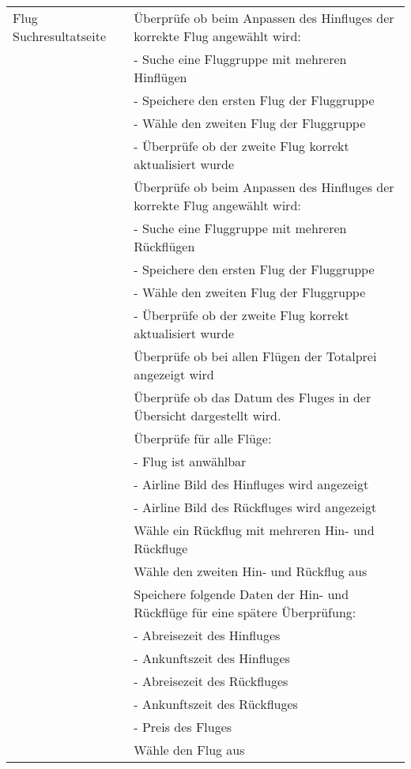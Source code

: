 \begin{table}[H]
\begin{tabularx}{0.9\textwidth}{ | l | X | }
		\multirow{1}{*}{Flug Suchresultatseite} & Überprüfe ob beim Anpassen des Hinfluges der korrekte Flug angewählt wird: \\ \cline{2-2}
		& - Suche eine Fluggruppe mit mehreren Hinflügen \\ \cline{2-2}
		& - Speichere den ersten Flug der Fluggruppe \\ \cline{2-2}
		& - Wähle den zweiten Flug der Fluggruppe \\ \cline{2-2}
		& - Überprüfe ob der zweite Flug korrekt aktualisiert wurde \\ \cline{2-2}& Überprüfe ob beim Anpassen des Hinfluges der korrekte Flug angewählt wird: \\ \cline{2-2}
		& - Suche eine Fluggruppe mit mehreren Rückflügen \\ \cline{2-2}
		& - Speichere den ersten Flug der Fluggruppe \\ \cline{2-2}
		& - Wähle den zweiten Flug der Fluggruppe \\ \cline{2-2}
		& - Überprüfe ob der zweite Flug korrekt aktualisiert wurde \\ \cline{2-2}
		& Überprüfe ob bei allen Flügen der Totalprei angezeigt wird \\ \cline{2-2}
		& Überprüfe ob das Datum des Fluges in der Übersicht dargestellt wird. \\ \cline{2-2}
		& Überprüfe für alle Flüge: \\ \cline{2-2}
		& - Flug ist anwählbar \\ \cline{2-2}
		& - Airline Bild des Hinfluges wird angezeigt \\ \cline{2-2}
		& - Airline Bild des Rückfluges wird angezeigt \\ \cline{2-2}
		& Wähle ein Rückflug mit mehreren Hin- und Rückfluge \\ \cline{2-2}
		& Wähle den zweiten Hin- und Rückflug aus \\ \cline{2-2}
		& Speichere folgende Daten der Hin- und Rückflüge für eine spätere Überprüfung: \\ \cline{2-2}
		& - Abreisezeit des Hinfluges \\ \cline{2-2}
		& - Ankunftszeit des Hinfluges \\ \cline{2-2}
		& - Abreisezeit des Rückfluges \\ \cline{2-2}
		& - Ankunftszeit des Rückfluges \\ \cline{2-2}
		& - Preis des Fluges \\ \cline{2-2}
		& Wähle den Flug aus \\ \hline
		

\end{tabularx}
\end{table}
